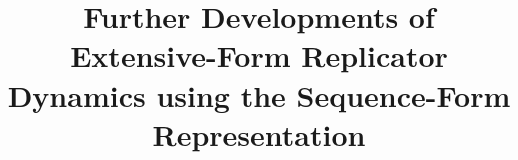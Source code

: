 \documentclass{aamas2014}
\begin{document}


\title{Further Developments of Extensive-Form Replicator Dynamics using the Sequence-Form Representation}




%
%
%
%

%

\end{document}
